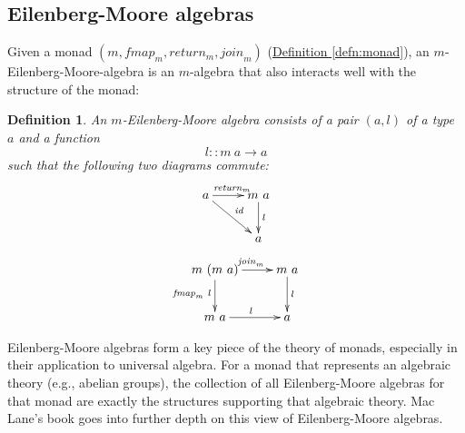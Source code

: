 \documentclass{jfp1}
\newtheorem{definition}{Definition}
\newcommand{\defref}[1]{\hyperref[#1]{Definition \ref*{#1}}}
\begin{document}
\subsection{Eilenberg-Moore algebras}
\label{sec:eilenberg-moore-algebras}

Given a monad $(m, \mathit{fmap}_m, \mathit{return}_m,
\mathit{join}_m)$ (\defref{defn:monad}), an
$m$-Eilenberg-Moore-algebra is an $m$-algebra that also interacts well
with the structure of the monad:

\begin{definition}
  An \emph{$m$-Eilenberg-Moore algebra} consists of a pair
  $(a,l)$ of a type $a$ and a function
  \begin{displaymath}
    l :: m~a \to a
  \end{displaymath}
  such that the following two diagrams commute:
  \begin{equation}
    \label{eq:em-alg-return}
    \xymatrix{
      {a} \ar[r]^{\mathit{return}_m} \ar[rd]^{\mathit{id}}
      &
      {m~a} \ar[d]^{l}
      \\
      &
      {a}
    }
  \end{equation}
  \begin{equation}
    \label{eq:em-alg-join}
    \xymatrix{
      {m~(m~a)} \ar[r]^{\mathit{join}_m} \ar[d]_{\mathit{fmap}_m~l}
      &
      {m~a} \ar[d]^{l}
      \\
      {m~a} \ar[r]^l
      &
      {a}
    }
  \end{equation}
\end{definition}

Eilenberg-Moore algebras form a key piece of the theory of monads,
especially in their application to universal algebra. For a monad that
represents an algebraic theory (e.g., abelian groups), the collection
of all Eilenberg-Moore algebras for that monad are exactly the
structures supporting that algebraic theory. Mac Lane's book
\cite{maclane98} goes into further depth on this view of
Eilenberg-Moore algebras.
\end{document}

